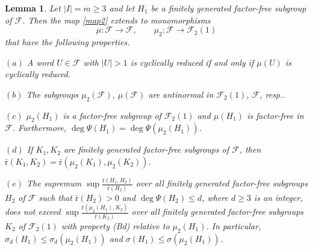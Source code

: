 \documentclass[10pt, reqno]{amsart}
\numberwithin{equation}{section}
\newtheorem{lem}[thm]{Lemma}
\begin{document}
\begin{lem}\label{lemmap2} Let $|I| = m \ge 3$ and let $H_1$ be a finitely generated factor-free subgroup of ${\mathcal{F}}$.  Then the map \eqref{map2} extends to monomorphisms
 $$
 \mu : {\mathcal{F}} \to {\mathcal{F}} , \qquad \mu_2 : {\mathcal{F}} \to  {\mathcal{F}}_2(1)
 $$
 that have the following properties.

 $(a)$ A word $U \in {\mathcal{F}}$ with $|U| >1$ is cyclically reduced if and only if $\mu(U)$ is cyclically reduced.

 $(b)$  The subgroups $\mu_2({\mathcal{F}} )$,   $\mu({\mathcal{F}} )$ are  antinormal in ${\mathcal{F}}_2(1)$,  ${\mathcal{F}}$, resp..

 $(c)$   $\mu_2(H_1)$ is a factor-free subgroup of ${\mathcal{F}}_2(1)$ and $\mu(H_1)$ is factor-free in ${\mathcal{F}}$.  Furthermore, $\deg \Psi(H_1) = \deg  \Psi(\mu_2(H_1))$.

 $(d)$   If $K_1, K_2$ are  finitely generated  factor-free subgroups of ${\mathcal{F}}$, then   ${\bar {\mathrm{r}}}(K_1, K_2)   =    {\bar {\mathrm{r}}}(  \mu_2(K_1) , \mu_2(K_2) )$.

$(e)$   The supremum  $\sup \frac{ {\bar {\mathrm{r}}}(  H_1, H_2   )  }{  {\bar {\mathrm{r}}}(H_2 ) }$
over all finitely generated factor-free subgroups $H_2$ of ${\mathcal{F}}$
such that  ${\bar {\mathrm{r}}}(H_2) > 0$  and $ \deg  \Psi(H_2) \le d$,  where $d \ge 3$ is an integer,  does not exceed  $\sup \frac{ {\bar {\mathrm{r}}}(  \mu_2( H_1), K_2   )  }{  {\bar {\mathrm{r}}}(K_2 ) }$  over all finitely generated factor-free subgroups $K_2$ of  ${\mathcal{F}}_2(1)$ with property (Bd) relative to $\mu_2( H_1)$.
In particular, $\sigma_d(H_1) \le  \sigma_d( \mu_2( H_1))$ and   $\sigma(H_1) \le  \sigma( \mu_2( H_1))$.
\end{lem}
\end{document}
